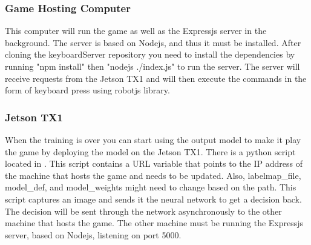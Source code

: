 \documentclass[onecolumn, draftclsnofoot,10pt, compsoc]{IEEEtran}
\begin{document}
\subsubsection{Game Hosting Computer}

This computer will run the game as well as the Expressjs server in the background.
The server is based on Nodejs, and thus it must be installed.
After cloning the keyboardServer repository you need to install the dependencies by running "npm install" then "nodejs ./index.js" to run the server.
The server will receive requests from the Jetson TX1 and will then execute the commands in the form of keyboard press using robot\-js library.

\subsubsection{Jetson TX1}

When the training is over you can start using the output model to make it play the game by deploying the model on the Jetson TX1.
There is a python script located in .
This script contains a URL variable that points to the IP address of the machine that hosts the game and needs to be updated.
Also, labelmap\_file, model\_def, and model\_weights might need to change based on the path. 
This script captures an image and sends it the neural network to get a decision back.
The decision will be sent through the network asynchronously to the other machine that hosts the game.
The other machine must be running the Expressjs server, based on Nodejs, listening on port 5000.
\end{document}
